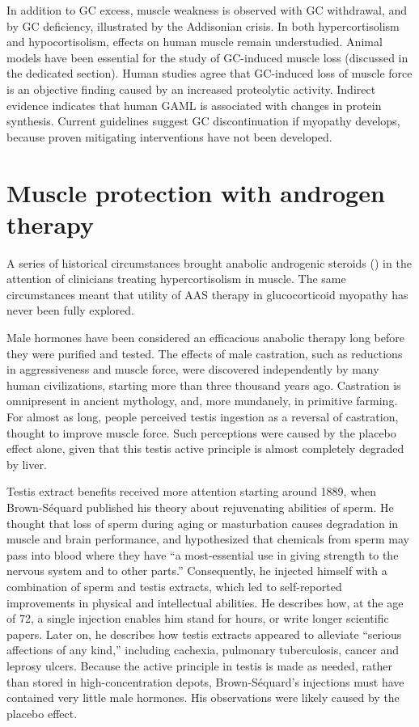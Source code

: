 \documentclass[12pt,english]{report}\usepackage[]{graphicx}\usepackage[]{color}
\begin{document}
In addition to GC excess, muscle weakness is observed with GC withdrawal\citep{amatruda1960study},
and by GC deficiency, illustrated by the Addisonian crisis\citep{mor1987myopathy}.
In both hypercortisolism and hypocortisolism, effects on human muscle
remain understudied. Animal models have been essential for the study
of GC-induced muscle loss (discussed in the dedicated section). Human
studies agree that GC-induced loss of muscle force is an objective
finding caused by an increased proteolytic activity. Indirect evidence
indicates that human GAML is associated with changes in protein synthesis.
Current guidelines suggest GC discontinuation if myopathy develops,
because proven mitigating interventions have not been developed.


\section{Muscle protection with androgen therapy}

A series of historical circumstances brought anabolic androgenic steroids
() in the attention
of clinicians treating hypercortisolism in muscle. The same circumstances
meant that utility of AAS therapy in glucocorticoid myopathy has never
been fully explored.

Male hormones have been considered an efficacious anabolic therapy
long before they were purified and tested. The effects of male castration,
such as reductions in aggressiveness and muscle force, were discovered
independently by many human civilizations, starting more than three
thousand years ago. Castration is omnipresent in ancient mythology,
and, more mundanely, in primitive farming. For almost as long, people
perceived testis ingestion as a reversal of castration, thought to
improve muscle force. Such perceptions were caused by the placebo
effect alone, given that this testis active principle is almost completely
degraded by liver.

Testis extract benefits received more attention starting around 1889,
when Brown-Séquard published his theory about rejuvenating abilities
of sperm. He thought that loss of sperm during aging or masturbation
causes degradation in muscle and brain performance, and hypothesized
that chemicals from sperm may pass into blood where they have ``a
most-essential use in giving strength to the nervous system and to
other parts.'' Consequently, he injected himself with a combination
of sperm and testis extracts, which led to self-reported improvements
in physical and intellectual abilities\citep{brown-sequard1889note}.
He describes how, at the age of 72, a single injection enables him
stand for hours, or write longer scientific papers. Later on, he describes
how testis extracts appeared to alleviate ``serious affections of
any kind,'' including cachexia, pulmonary tuberculosis, cancer and
leprosy ulcers\citep{brown-sequard1893new}. Because the active principle
in testis is made as needed, rather than stored in high-concentration
depots, Brown-Séquard’s injections must have contained very little
male hormones. His observations were likely caused by the placebo
effect.
\end{document}
